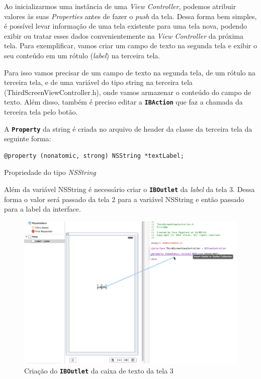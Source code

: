 \documentclass[a4paper,12pt,brazil,doubleside]{book}
\begin{document}
\begin{singlespace}
Ao inicializarmos uma instância de uma \emph{View Controller}, podemos atribuir valores às suas \emph{Properties} antes de fazer o \emph{push} da tela. Dessa forma bem simples, é possível levar informação de uma tela existente para uma tela nova, podendo exibir ou tratar esses dados convenientemente na \emph{View Controller} da próxima tela. Para exemplificar, vamos criar um campo de texto na segunda tela e exibir o seu conteúdo em um rótulo (\emph{label}) na terceira tela.

Para isso vamos precisar de um campo de texto na segunda tela, de um rótulo na terceira tela, e de uma variável do tipo string na terceira tela (ThirdScreenViewController.h), onde vamos armazenar o conteúdo do campo de texto. Além disso, também é preciso editar a \texttt{\textbf{IBAction}} que faz a chamada da terceira tela pelo botão.

A \texttt{\textbf{Property}} da string é criada no arquivo de header da classe da terceira tela da seguinte forma:

\begin{listing}[H]
\begin{verbatim}
@property (nonatomic, strong) NSString *textLabel;
\end{verbatim}
\caption{Propriedade do tipo \emph{NSString}}
\end{listing}

Além da variável NSString é necessário criar o \texttt{\textbf{IBOutlet}} da \emph{label} da tela 3. Dessa forma o valor será passado da tela 2 para a variável NSString e então passado para a label da interface.

\begin{figure}[H]
  \centering
  \includegraphics[width=.99\textwidth]{figuras/3/tela_novo_projeto_45.png}
  \caption{Criação do \texttt{\textbf{IBOutlet}} da caixa de texto da tela 3}
  \label{fig:a}
\end{figure} 


\end{singlespace}
\end{document}
